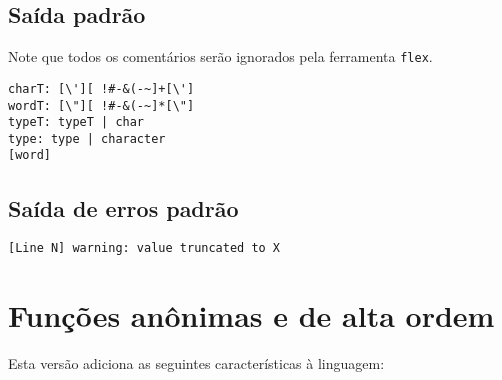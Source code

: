 \documentclass{article}
\begin{document}
\subsection{Saída padrão}

Note que todos os comentários serão ignorados pela ferramenta \texttt{flex}.

\begin{verbatim}
charT: [\'][ !#-&(-~]+[\']
wordT: [\"][ !#-&(-~]*[\"]
typeT: typeT | char
type: type | character
[word]
\end{verbatim}

\subsection{Saída de erros padrão}

\begin{verbatim}
[Line N] warning: value truncated to X
\end{verbatim}

\section{Funções anônimas e de alta ordem}

Esta versão adiciona as seguintes características à linguagem:
\end{document}
